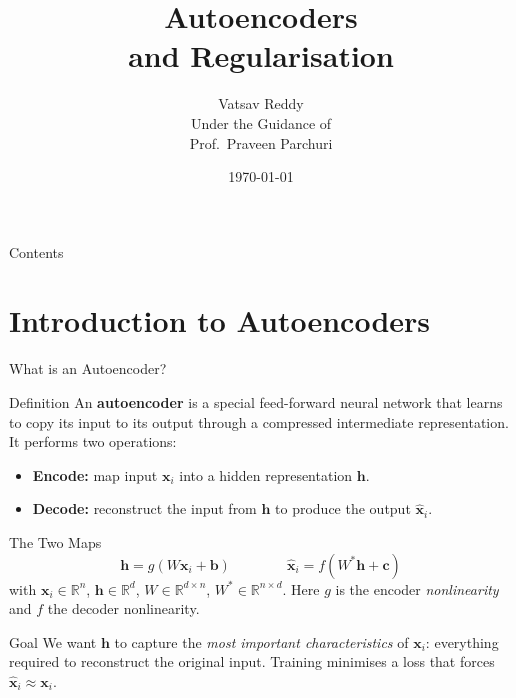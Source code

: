 \documentclass{beamer}
\title[Autoencoders \& Regularisation]{%
  Autoencoders\\[4pt]
  and Regularisation}
\author[Vatsav Reddy]{%
  \texorpdfstring{%
    {\Large Vatsav Reddy}\\[6pt]
    {\small Under the Guidance of}\\[2pt]
    {\small Prof.\ Praveen Parchuri}%
  }{Vatsav Reddy}}
\institute[IIITH]{%
  {\normalsize International Institute of Information Technology, Hyderabad}}
\date{\today}
\begin{document}
\begin{frame}
  \titlepage
\end{frame}

\begin{frame}[shrink=20]{Contents}
  \tableofcontents
\end{frame}


\section{Introduction to Autoencoders}

\begin{frame}[shrink=10]{What is an Autoencoder?}
  \begin{block}{Definition}
    An \textbf{autoencoder} is a special feed-forward neural network that
    learns to copy its input to its output through a compressed
    intermediate representation. It performs two operations:
    \begin{itemize}\setlength\itemsep{4pt}
      \item \textbf{Encode:} map input $\mathbf{x}_i$ into a hidden
            representation $\mathbf{h}$.
      \item \textbf{Decode:} reconstruct the input from $\mathbf{h}$ to
            produce the output $\hat{\mathbf{x}}_i$.
    \end{itemize}
  \end{block}

  \begin{block}{The Two Maps}
    \[
      \mathbf{h} = g(W\mathbf{x}_i + \mathbf{b})
      \qquad\qquad
      \hat{\mathbf{x}}_i = f(W^{*}\mathbf{h} + \mathbf{c})
    \]
    with $\mathbf{x}_i \in \mathbb{R}^{n}$, $\mathbf{h} \in \mathbb{R}^{d}$,
    $W \in \mathbb{R}^{d\times n}$, $W^{*} \in \mathbb{R}^{n\times d}$.
    Here $g$ is the encoder \emph{nonlinearity} and $f$ the decoder
    nonlinearity.
  \end{block}

  \begin{alertblock}{Goal}
    We want $\mathbf{h}$ to capture the \emph{most important
    characteristics} of $\mathbf{x}_i$: everything required to reconstruct
    the original input.
    Training minimises a loss that forces
    $\hat{\mathbf{x}}_i \approx \mathbf{x}_i$.
  \end{alertblock}
\end{frame}
\end{document}
